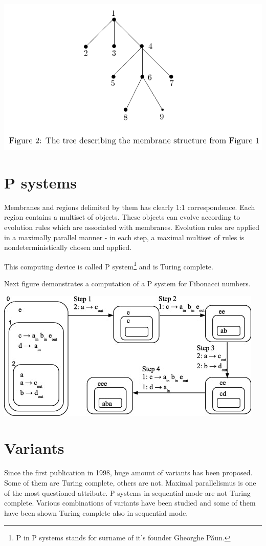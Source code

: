\documentclass[myposter,portrait]{sciposter}
\def\mysection#1{
{\color{sectionCol}\section*{\sc\bfseries #1}}}
\begin{document}
\begin{multicols*}{3}
\includegraphics[width=\columnwidth]{membrane_tree}

\mysection{P systems}

Membranes and regions delimited by them has clearly 1:1 correspondence. Each region contains a multiset of objects. These objects can evolve according to evolution rules which are associated with membranes. Evolution rules are applied in a maximally parallel manner - in each step, a maximal multiset of rules is nondeterministically chosen and applied.

This computing device is called P system\footnote{P in P systems stands for surname of it's founder Gheorghe P\u aun.} and is Turing complete.

Next figure demonstrates a computation of a P system for Fibonacci numbers.

\includegraphics[width=\columnwidth]{p_system_fibonacci}

\mysection{Variants}

Since the first publication in 1998, huge amount of variants has been proposed. Some of them are Turing complete, others are not. Maximal parallelismus is one of the most questioned attribute. P systems in sequential mode are not Turing complete. Various combinations of variants have been studied and some of them have been shown Turing complete also in sequential mode.


\end{multicols*}
\end{document}
